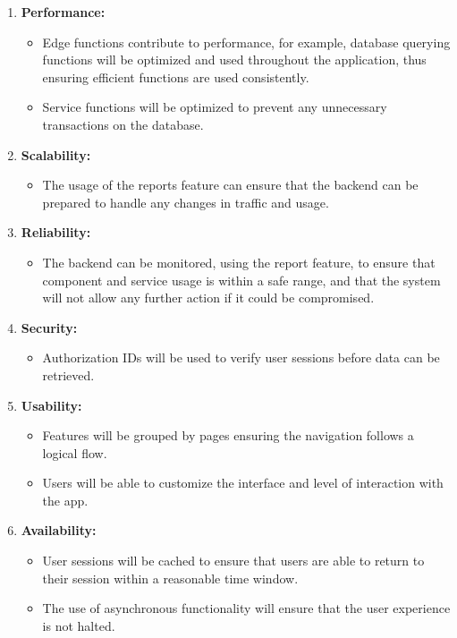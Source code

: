 \documentclass{article}
\begin{document}
\begin{enumerate}[label=\arabic*.]
    \item \textbf{Performance:}
    \begin{itemize}
        \item Edge functions contribute to performance, for example, database querying functions will be optimized and used throughout the application, thus ensuring efficient functions are used consistently.
        \item Service functions will be optimized to prevent any unnecessary transactions on the database.
    \end{itemize}

    \item \textbf{Scalability:}
    \begin{itemize}
        \item The usage of the reports feature can ensure that the backend can be prepared to handle any changes in traffic and usage.
    \end{itemize}

    \item \textbf{Reliability:}
    \begin{itemize}
        \item The backend can be monitored, using the report feature, to ensure that component and service usage is within a safe range, and that the system will not allow any further action if it could be compromised.
    \end{itemize}

    \item \textbf{Security:}
    \begin{itemize}
        \item Authorization IDs will be used to verify user sessions before data can be retrieved.
    \end{itemize}

    \item \textbf{Usability:}
    \begin{itemize}
        \item Features will be grouped by pages ensuring the navigation follows a logical flow.
        \item Users will be able to customize the interface and level of interaction with the app.
    \end{itemize}

    \item \textbf{Availability:}
    \begin{itemize}
        \item User sessions will be cached to ensure that users are able to return to their session within a reasonable time window.
        \item The use of asynchronous functionality will ensure that the user experience is not halted.
    \end{itemize}


\end{enumerate}
\end{document}
